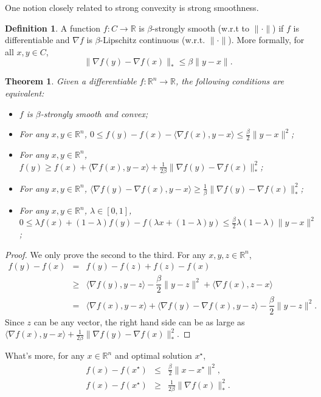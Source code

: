\documentclass[openany]{book}
\newtheorem{theorem}{Theorem}[chapter]
\theoremstyle{definition}
\newtheorem{definition}{Definition}[chapter]
\theoremstyle{remark}
\begin{document}
One notion closely related to strong convexity is strong smoothness.
\begin{definition}
    A function $f:C\rightarrow \mathbb{R}$ is $\beta$-strongly smooth (w.r.t to $\|\cdot\|$) if $f$ is differentiable and $\nabla f$ is $\beta$-Lipschitz continuous (w.r.t. $\|\cdot\|$). More formally, for all $x,y\in C$,
    \begin{equation}
        \|\nabla f(y)-\nabla f(x)\|_*\le\beta\|y-x\|.
    \end{equation}
\end{definition}
\begin{theorem}\label{StrSmoothEquiv}
    Given a differentiable $f:\mathbb{R}^n\rightarrow \mathbb{R}$, the following conditions are equivalent:
    \begin{itemize}
        \item $f$ is $\beta$-strongly smooth and convex;
        \item For any $x,y\in \mathbb{R}^n$, $0\le f(y)-f(x)-\langle\nabla f(x),y-x\rangle\le\frac{\beta}{2}\|y-x\|^2$;
        \item For any $x,y\in \mathbb{R}^n$, $f(y)\ge f(x)+\langle\nabla f(x),y-x\rangle+\frac{1}{2\beta}\|\nabla f(y)-\nabla f(x)\|_*^2$;
        \item For any $x,y\in \mathbb{R}^n$, $\langle\nabla f(y)-\nabla f(x),y-x\rangle\ge\frac{1}{\beta}\|\nabla f(y)-\nabla f(x)\|_*^2$;
        \item For any $x,y\in \mathbb{R}^n$, $\lambda\in[0,1]$, $0\le\lambda f(x)+(1-\lambda)f(y)-f(\lambda x+(1-\lambda)y)\le\frac{\beta}{2}\lambda(1-\lambda)\|y-x\|^2$;
    \end{itemize}
\end{theorem}
\begin{proof}
    We only prove the second to the third. For any $x,y,z\in \mathbb{R}^n$,
    \begin{equation*}
        \begin{array}{rcl}
            f(y)-f(x) & = & f(y)-f(z)+f(z)-f(x) \\
             & \ge & \langle\nabla f(y),y-z\rangle-\dfrac{\beta}{2}\|y-z\|^2+\langle\nabla f(x),z-x\rangle \\
             & = & \langle\nabla f(x),y-x\rangle+\langle\nabla f(y)-\nabla f(x),y-z\rangle-\dfrac{\beta}{2}\|y-z\|^2.
        \end{array}
    \end{equation*}
    Since $z$ can be any vector, the right hand side can be as large as $\langle\nabla f(x),y-x\rangle+\frac{1}{2\beta}\|\nabla f(y)-\nabla f(x)\|_*^2$.
\end{proof}
What's more, for any $x\in \mathbb{R}^n$ and optimal solution $x^{\star}$,
\begin{eqnarray}
    f(x)-f(x^{\star}) & \le & \frac{\beta}{2}\|x-x^{\star}\|^2, \\
    f(x)-f(x^{\star}) & \ge & \frac{1}{2\beta}\|\nabla f(x)\|_*^2.
\end{eqnarray}
\end{document}
